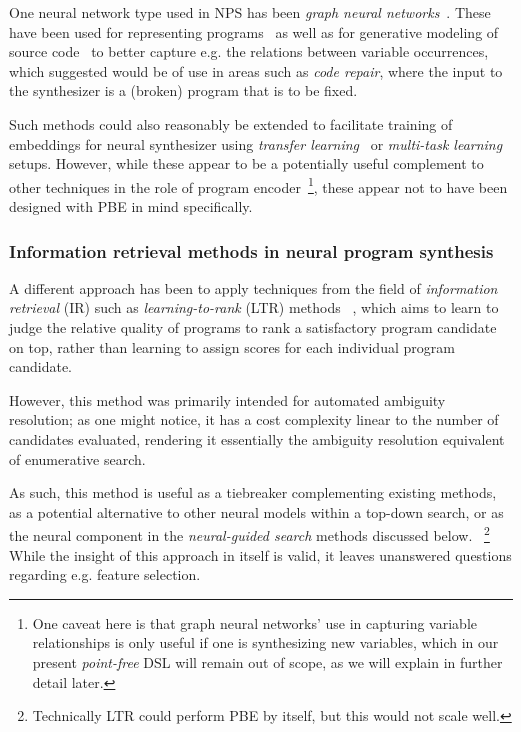 \documentclass{article}
\begin{document}
One neural network type used in NPS has been
\emph{graph neural networks}~\citep{shuman2013emerging,wu2020comprehensive}.
These have been used for representing programs~\citep{allamanis2017learning}
as well as for generative modeling of source code~\citep{brockschmidt2018generative}%
to better capture e.g. the relations between variable occurrences,
which \citet{brockschmidt2018generative} suggested would be of use in areas such as \emph{code repair},
where the input to the synthesizer is a (broken) program that is to be fixed.

Such methods could also reasonably be extended to facilitate training of embeddings for neural synthesizer using \emph{transfer learning}~\citep{pan2009survey} or \emph{multi-task learning}~\citep{multitasklearning} setups.
However, while these appear to be a potentially useful complement to other techniques
in the role of program encoder~\footnote{
    One caveat here is that graph neural networks' use in capturing
    variable relationships is only useful if one is synthesizing new variables,
    which in our present \emph{point-free} DSL will remain out of scope,
    as we will explain in further detail later.
}, these appear not to have been designed with PBE in mind specifically.

\subsubsection{Information retrieval methods in neural program synthesis}

A different approach has been to apply techniques from the field of
\emph{information retrieval} (IR) such as \emph{learning-to-rank} (LTR) methods%
~\citep{singh2015predicting}, which aims to learn to judge the
relative quality of programs to rank a satisfactory program candidate on top,
rather than learning to assign scores for each individual program candidate.

However, this method was primarily intended for automated ambiguity resolution;
as one might notice,
it has a cost complexity linear to the number of candidates evaluated,
rendering it essentially the ambiguity resolution equivalent of enumerative search.

As such, this method is useful as a tiebreaker complementing existing methods,
as a potential alternative to other neural models within a top-down search,
or as the neural component in the \emph{neural-guided search} methods discussed below.%
~\footnote{Technically LTR could perform PBE by itself, but this would not scale well.}
While the insight of this approach in itself is valid,
it leaves unanswered questions regarding e.g. feature selection.
\end{document}

